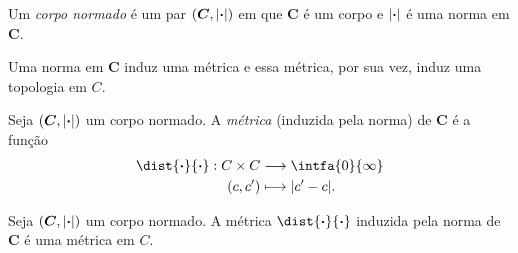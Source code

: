 \begin{defi}
Um \emph{corpo normado} é um par $(\bm C,\left\vert{\bm{\cdot}}\right\vert)$ em que $\bm C$ é um corpo e $\left\vert{\bm{\cdot}}\right\vert$ é uma norma em $\bm C$.
\end{defi}

Uma norma em $\bm C$ induz uma métrica e essa métrica, por sua vez, induz uma topologia em $C$.

\begin{defi}
Seja $(\bm C,\left\vert{\bm{\cdot}}\right\vert)$ um corpo normado. A \emph{métrica} (induzida pela norma) de $\bm C$ é a função
	\begin{align*}
	\func{\dist{\var}{\var}}{C \times C}{\intfa{0}{\infty}}{(c,c')}{\abs{c'-c}}.
	\end{align*}
\end{defi}

\begin{prop}
Seja $(\bm C,\left\vert{\bm{\cdot}}\right\vert)$ um corpo normado. A métrica $\dist{\var}{\var}$ induzida pela norma de $\bm C$ é uma métrica em $C$.
\end{prop}

